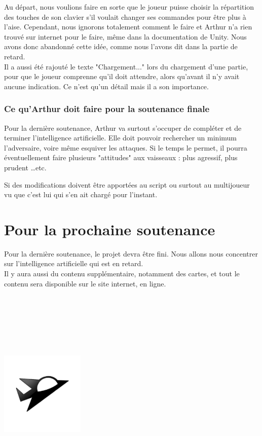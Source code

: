 \documentclass[10pt, titlepage]{report}
\begin{document}
Au départ, nous voulions faire en sorte que le joueur puisse choisir la répartition des touches de son clavier s'il voulait changer ses commandes pour être plus à l'aise. Cependant, nous ignorons totalement comment le faire et Arthur n'a rien trouvé sur internet pour le faire, même dans la documentation de Unity. Nous avons donc abandonné cette idée, comme nous l'avons dit dans la partie de retard.\\

Il a aussi été rajouté le texte "Chargement..." lors du chargement d'une partie, pour que le joueur comprenne qu'il doit attendre, alors qu'avant il n'y avait aucune indication. Ce n'est qu'un détail mais il a son importance.\\

\subsection{Ce qu'Arthur doit faire pour la soutenance finale}

Pour la dernière soutenance, Arthur va surtout s'occuper de compléter et de terminer l'intelligence artificielle. Elle doit pouvoir rechercher un minimum l'adversaire, voire même esquiver les attaques. Si le temps le permet, il pourra éventuellement faire plusieurs "attitudes" aux vaisseaux : plus agressif, plus prudent \dots  etc.

Si des modifications doivent être apportées au script ou surtout au multijoueur vu que c'est lui qui s'en ait chargé pour l'instant.

\chapter{Pour la prochaine soutenance}

Pour la dernière soutenance, le projet devra être fini. Nous allons nous concentrer sur l'intelligence artificielle qui est en retard.\\

Il y aura aussi du contenu supplémentaire, notamment des cartes, et tout le contenu sera disponible sur le site internet, en ligne.\\ \\ \\ \\ \\ \\ \\

\begin{center}
\includegraphics[height=4cm, width=4cm]{vaisseux_petit.png}
\end{center}
\end{document}
